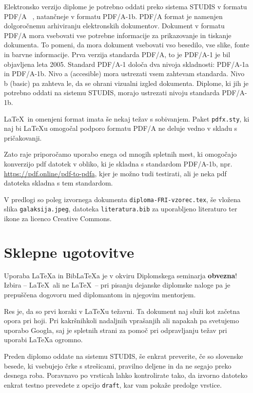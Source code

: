 \documentclass[a4paper,12pt,openright]{book}
\newcommand{\BibLaTeX}{{\sc Bib}\LaTeX}
\begin{document}
Elektronsko verzijo diplome je potrebno oddati preko sistema STUDIS v formatu PDF/A ~\cite{howtopdfa,pdfa},
natančneje v formatu PDF/A-1b. 
PDF/A format je namenjen dolgoročnemu arhiviranju elektronskih dokumentov.
Dokument v formatu PDF/A mora vsebovati vse potrebne informacije za prikazovanje in tiskanje dokumenta. To pomeni, da mora dokument  vsebovati vso besedilo, vse slike, fonte in barvne informacije.
Prva verzija standarda PDF/A, to je PDF/A-1 je bil objavljena leta 2005.
Standard PDF/A-1 določa dva nivoja skladnosti: PDF/A-1a in PDF/A-1b.
Nivo a (accesible) mora ustrezati vsem zahtevam standarda.
Nivo b (basic) pa zahteva le, da se ohrani vizualni izgled dokumenta.
Diplome, ki jih je potrebno oddati na sistemu STUDIS, morajo ustrezati nivoju standarda 
PDF/A-1b.

\LaTeX\ in omenjeni format imata še nekaj težav s sobivanjem. 
Paket \texttt{pdfx.sty}, ki naj bi \LaTeX{u} omogočal podporo formatu PDF/A ne deluje vedno
v skladu s pričakovanji. 

Zato raje priporočamo uporabo enega od mnogih spletnih mest, ki omo\-go\-ča\-jo konverzijo pdf datotek v obliko,
ki je skladna s standardom PDF/A-1b, npr. \url{https://pdf.online/pdf-to-pdfa}, kjer je
možno tudi testirati, ali je neka pdf datoteka skladna s tem standardom.

V predlogi so poleg izvornega  dokumenta \texttt{diploma-FRI-vzorec.tex}, še vložena slika \texttt{galaksija.jpeg}, datoteka \texttt{literatura.bib} za uporabljeno literaturo  ter
ikone za licenco Creative Commons.


\chapter{Sklepne ugotovitve}

Uporaba \LaTeX{a} in \BibLaTeX{a} je v okviru Diplomskega seminarja \textbf{obvezna}!
Izbira -- \LaTeX\ ali ne \LaTeX\ -- pri pisanju dejanske diplomske naloge pa je pre\-pu\-šče\-na dogovoru med diplomantom in njegovim mentorjem.

Res je, da so prvi koraki v \LaTeX{}u težavni. 
Ta dokument naj služi kot začetna opora pri hoji.
Pri kakršnihkoli nadaljnih vprašanjih ali napakah pa svetujemo uporabo Googla, saj je spletnih strani za pomoč pri odpravljanju težav pri uporabi \LaTeX{}a ogromno.

Preden diplomo oddate na sistemu STUDIS, še enkrat preverite, če so slovenske besede, ki vsebujejo črke s strešicami,  pravilno deljene in da ne segajo preko desnega roba.
Poravnavo po vrsticah lahko kontrolirate tako, da izvorno datoteko enkrat testno prevedete z opcijo \texttt{draft}, kar vam pokaže  predolge vrstice.
\end{document}
